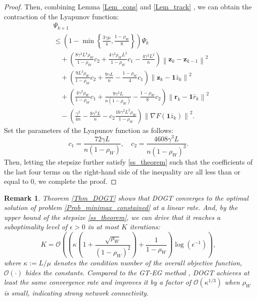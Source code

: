 \documentclass[10pt,a4paper]{amsart}
\newtheorem{Rem}{Remark}
\begin{document}
\begin{proof}
Then, combining Lemma \ref{Lem_cons} and \ref{Lem_track} , we can obtain the contraction of the Lyapunov function:
\begin{equation}
\begin{aligned}
&\varPsi _{k+1}
\\
&\leqslant \left( 1-\min \left\{ \frac{3\gamma \mu}{4}, \frac{1-\rho _W}{8} \right\} \right) \varPsi _{k}
\\
&\quad+\left( \frac{8\gamma ^2L^4\rho _W}{1-\rho _W}c_2+\frac{4\gamma ^2\rho _WL^2}{1-\rho _W}c_1-\frac{4\gamma ^2L^2}{n} \right) \left\| \mathbf{z}_k-\mathbf{z}_{k-1} \right\| ^2
\\
&\quad+\left( \frac{9L^2\rho _W}{1-\rho _W}c_2+\frac{9\gamma L}{n}-\frac{1-\rho _W}{4}c_1 \right) \left\| \mathbf{z}_k-\mathbf{1}\bar{z}_k \right\| ^2
\\
&\quad+\left( \frac{4\gamma ^2\rho _W}{1-\rho _W}c_1+\frac{9\gamma ^3L}{n\left( 1-\rho _W \right)}-\frac{1-\rho _W}{8}c_2 \right) \left\| \mathbf{r}_k-\mathbf{1}\bar{r}_k \right\| ^2
\\
&\quad-\left( \frac{\gamma ^2}{4n}-\frac{8\gamma ^3L}{n}-c_2\frac{16\gamma ^2L^2\rho _W}{1-\rho _W} \right) \left\| \nabla F\left( \mathbf{1}\bar{z}_k \right) \right\| ^2.
\end{aligned}
\end{equation}
Set the parameters of the Lyapunov function as follows:
\begin{equation}
c_1=\frac{72\gamma L}{n\left( 1-\rho _W \right)},  \quad
c_2=\frac{4608\gamma ^3L}{n\left( 1-\rho _W \right) ^3}.
\end{equation}
Then, letting the stepsize further satisfy \eqref{ss_theorem} such that the coefficients of the last four terms on the right-hand side of the inequality are all less than or equal to 0, we complete the proof.
\end{proof}


\begin{Rem}
Theorem \ref{Thm_DOGT} shows that DOGT converges to the optimal solution of problem \eqref{Prob_minimax_constained} at a linear rate. And, by the upper bound of the stepsize \eqref{ss_theorem}, we can drive that it reaches a suboptimality level of $\epsilon > 0$ in at most $K$ iterations:
\begin{equation}\label{Eq_iter_complexity_DOGT}
K=\mathcal{O} \left( \left( \kappa \left( 1+\frac{\sqrt{\rho _W}}{\left( 1-\rho _W \right) ^2} \right) +\frac{1}{1-\rho _W} \right) \log \left( \epsilon ^{-1} \right) \right),
\end{equation}
where $\kappa:=L/\mu$ denotes the condition number of the overall objective function, $\mathcal{O} \left( \cdot \right) $ hides the constants. Compared to the GT-EG method \cite{mukherjee2020decentralized}, DOGT achieves at least the same convergence rate and improves it by a factor of $\mathcal{O} \left( \kappa ^{1/3} \right)$ when $\rho_W$ is small, indicating strong network connectivity. 
\end{Rem}
\end{document}
